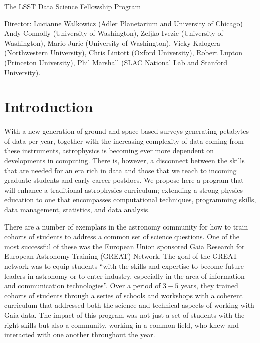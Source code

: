 \documentclass[nofootbib,floatfix,11pt]{article}
\begin{document}
 

\begin{center}
{\Large The  LSST Data Science Fellowship Program}

Director: Lucianne Walkowicz (Adler Planetarium and University of Chicago)\\
Andy Connolly (University of Washington),  Zeljko Ivezic (University of Washington), Mario Juric  (University of Washington), Vicky Kalogera (Northwestern University), Chris Lintott (Oxford University), Robert Lupton (Princeton University), Phil Marshall (SLAC National Lab and Stanford University).

\end{center}

\bigskip

\section{Introduction}

With a new generation of ground and space-based surveys generating petabytes of data per year, together with the increasing complexity of data coming from these instruments, astrophysics is becoming ever more dependent on developments in computing. There is, however, a disconnect between the skills that are needed for an era rich in data and those that we teach to incoming graduate students and early-career postdocs. We propose here a program that will enhance a traditional astrophysics curriculum; extending a strong physics education to one that encompasses computational techniques, programming skills, data management, statistics, and data analysis.

There are a number of exemplars in the astronomy community for how to train cohorts of students to address a common set of science questions. One of the most successful of these was the European Union sponsored Gaia Research for European Astronomy Training (GREAT) Network. The goal of the GREAT network was to equip students ``with the skills and expertise to become future leaders in astronomy or to enter industry, especially in the area of information and communication technologies''.
Over a period of $3-5$ years, they trained cohorts of students through a series of schools and workshops with a coherent curriculum that addressed both the science and technical aspects of working with Gaia data. The impact of this program was not just a set of students with the right skills but also a community, working in a common field, who knew and interacted with one another throughout the year. 
\end{document}
